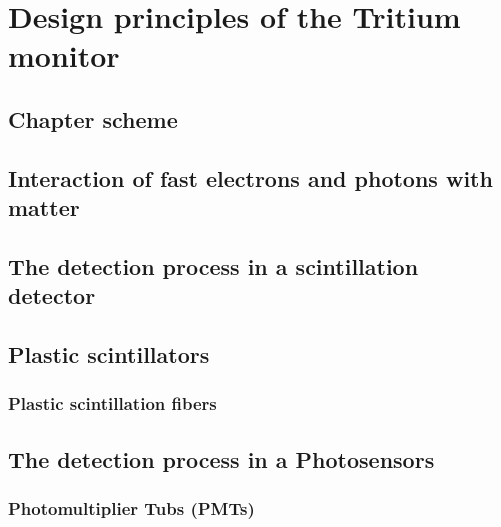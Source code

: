 \documentclass[12pt,a4paper]{book}
\begin{document}
\chapter[Design principles]{Design principles of the Tritium monitor}\label{chap:DesignPrinciples}
	\section{Chapter scheme}
	 \label{sec:IntroDesignPrinciples}

	\section[Interaction of particles with matter]{Interaction of fast electrons and photons with matter}
	 \label{sec:Interaction}
	\newpage	
	
	\section{The detection process in a scintillation detector}
	 \label{sec:DetectionProcess}
	\newpage
	
	\section{Plastic scintillators} %
	\label{sec:PlasticScintillators}
		\subsection{Plastic scintillation fibers}
		\label{subsec:PlasticScintillatorFibers}
		\newpage
		
	\section{The detection process in a Photosensors} %
	\label{sec:Photosensors}
	
			\subsection{Photomultiplier Tubs (PMTs)}%
			\label{subsec:PMTs}
		
\end{document}
